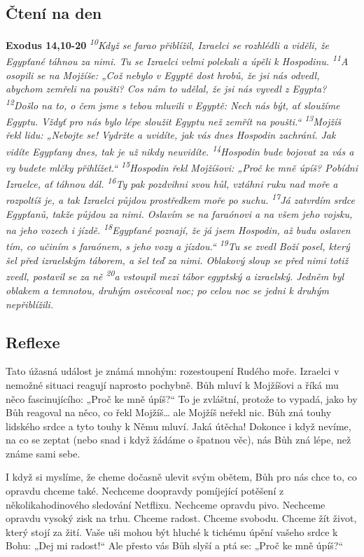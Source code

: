 \documentclass[11pt]{article}
\begin{document}
\subsection*{Čtení na den}
\textbf{Exodus 14,10-20}
\newline
\textit{
\textsuperscript{10}Když se farao přiblížil, Izraelci se rozhlédli a viděli, že Egypťané táhnou za nimi. Tu se Izraelci velmi polekali a úpěli k Hospodinu.
\textsuperscript{11}A osopili se na Mojžíše: „Což nebylo v Egyptě dost hrobů, že jsi nás odvedl, abychom zemřeli na poušti? Cos nám to udělal, že jsi nás vyvedl z Egypta?
\textsuperscript{12}Došlo na to, o čem jsme s tebou mluvili v Egyptě: Nech nás být, ať sloužíme Egyptu. Vždyť pro nás bylo lépe sloužit Egyptu než zemřít na poušti.“
\textsuperscript{13}Mojžíš řekl lidu: „Nebojte se! Vydržte a uvidíte, jak vás dnes Hospodin zachrání. Jak vidíte Egypťany dnes, tak je už nikdy neuvidíte.
\textsuperscript{14}Hospodin bude bojovat za vás a vy budete mlčky přihlížet.“
\textsuperscript{15}Hospodin řekl Mojžíšovi: „Proč ke mně úpíš? Pobídni Izraelce, ať táhnou dál.
\textsuperscript{16}Ty pak pozdvihni svou hůl, vztáhni ruku nad moře a rozpoltíš je, a tak Izraelci půjdou prostředkem moře po suchu.
\textsuperscript{17}Já zatvrdím srdce Egypťanů, takže půjdou za nimi. Oslavím se na faraónovi a na všem jeho vojsku, na jeho vozech i jízdě.
\textsuperscript{18}Egypťané poznají, že já jsem Hospodin, až budu oslaven tím, co učiním s faraónem, s jeho vozy a jízdou.“
\textsuperscript{19}Tu se zvedl Boží posel, který šel před izraelským táborem, a šel teď za nimi. Oblakový sloup se před nimi totiž zvedl, postavil se za ně
\textsuperscript{20}a vstoupil mezi tábor egyptský a izraelský. Jedněm byl oblakem a temnotou, druhým osvěcoval noc; po celou noc se jedni k druhým nepřiblížili.
}

\subsection*{Reflexe}
Tato úžasná událost je známá mnohým: rozestoupení Rudého moře. Izraelci v nemožné situaci reagují naprosto
pochybně. Bůh mluví k Mojžíšovi a říká mu něco fascinujícího: „Proč ke mně úpíš?“ To je zvláštní, protože to vypadá,
jako by Bůh reagoval na něco, co řekl Mojžíš… ale Mojžíš neřekl nic. Bůh zná touhy lidského srdce a tyto touhy
k Němu mluví. Jaká útěcha! Dokonce i když nevíme, na co se zeptat (nebo snad i když žádáme o špatnou věc), nás Bůh
zná lépe, než známe sami sebe.

I když si myslíme, že cheme dočasně ulevit svým obětem, Bůh pro nás chce to, co opravdu chceme také. Nechceme
doopravdy pomíjející potěšení z několikahodinového sledování Netflixu. Nechceme opravdu pivo. Nechceme opravdu
vysoký zisk na trhu. Chceme radost. Chceme svobodu. Chceme žít život, který stojí za žití. Vaše uši mohou být hluché
k tichému úpění vašeho srdce k Bohu: „Dej mi radost!“ Ale přesto vás Bůh slyší a ptá se: „Proč ke mně úpíš?“
\end{document}

